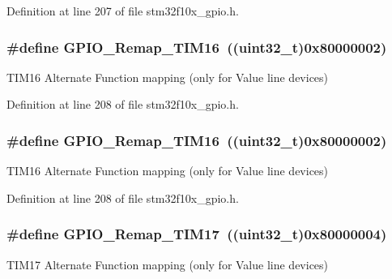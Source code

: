 Definition at line 207 of file stm32f10x\+\_\+gpio.\+h.

\subsubsection[{\texorpdfstring{G\+P\+I\+O\+\_\+\+Remap\+\_\+\+T\+I\+M16}{GPIO_Remap_TIM16}}]{\setlength{\rightskip}{0pt plus 5cm}\#define G\+P\+I\+O\+\_\+\+Remap\+\_\+\+T\+I\+M16~(({\bf uint32\+\_\+t})0x80000002)}\hypertarget{group___g_p_i_o___remap__define_gac9d612f9f9f9f66faecbdbbc29d2ac61}{}\label{group___g_p_i_o___remap__define_gac9d612f9f9f9f66faecbdbbc29d2ac61}
T\+I\+M16 Alternate Function mapping (only for Value line devices) 

Definition at line 208 of file stm32f10x\+\_\+gpio.\+h.

\subsubsection[{\texorpdfstring{G\+P\+I\+O\+\_\+\+Remap\+\_\+\+T\+I\+M16}{GPIO_Remap_TIM16}}]{\setlength{\rightskip}{0pt plus 5cm}\#define G\+P\+I\+O\+\_\+\+Remap\+\_\+\+T\+I\+M16~(({\bf uint32\+\_\+t})0x80000002)}\hypertarget{group___g_p_i_o___remap__define_gac9d612f9f9f9f66faecbdbbc29d2ac61}{}\label{group___g_p_i_o___remap__define_gac9d612f9f9f9f66faecbdbbc29d2ac61}
T\+I\+M16 Alternate Function mapping (only for Value line devices) 

Definition at line 208 of file stm32f10x\+\_\+gpio.\+h.

\subsubsection[{\texorpdfstring{G\+P\+I\+O\+\_\+\+Remap\+\_\+\+T\+I\+M17}{GPIO_Remap_TIM17}}]{\setlength{\rightskip}{0pt plus 5cm}\#define G\+P\+I\+O\+\_\+\+Remap\+\_\+\+T\+I\+M17~(({\bf uint32\+\_\+t})0x80000004)}\hypertarget{group___g_p_i_o___remap__define_ga9fe98e01f8837d6a1ac4b4833f0fc45e}{}\label{group___g_p_i_o___remap__define_ga9fe98e01f8837d6a1ac4b4833f0fc45e}
T\+I\+M17 Alternate Function mapping (only for Value line devices) 

